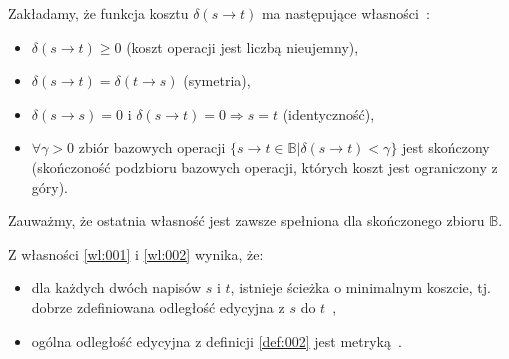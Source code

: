 \documentclass{praca1}
\begin{document}
\begin{property}\label{wl:002}
Zakładamy, że funkcja kosztu $\delta(s \rightarrow t)$ ma następujące własności~\cite{Boytsov2011:indexingmethods}:
\begin{itemize}
\item $\delta(s \rightarrow t) \geq 0$ (koszt operacji jest liczbą nieujemny),
\item $\delta(s \rightarrow t) = \delta(t \rightarrow s)$ (symetria),
\item $\delta(s \rightarrow s) = 0\text{ i } \delta(s \rightarrow t) = 0 \Rightarrow s = t$ (identyczność),
\item $\forall \gamma > 0$ zbiór bazowych operacji $\{s \rightarrow t \in \mathbb{B} | \delta(s \rightarrow t) < \gamma \}$ jest skończony (skończoność podzbioru bazowych operacji, których koszt jest ograniczony z góry).
\end{itemize}
\end{property}

Zauważmy, że ostatnia własność jest zawsze spełniona dla skończonego zbioru $\mathbb{B}$.

\begin{theorem}
Z własności \ref{wl:001} i \ref{wl:002} wynika, że:
\begin{itemize}
\item dla każdych dwóch napisów $s$ i $t$, istnieje ścieżka o minimalnym koszcie, tj. dobrze zdefiniowana odległość edycyjna z $s$ do $t$~\cite{Boytsov2011:indexingmethods},
\item ogólna odległość edycyjna z definicji \ref{def:002} jest metryką~\cite{Wagner1974:stringtostring}.
\end{itemize}
\end{theorem}
\end{document}
